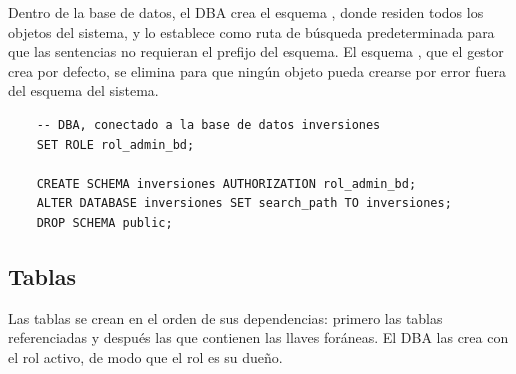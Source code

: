 Dentro de la base de datos, el DBA crea el esquema , donde residen todos los objetos del sistema, y lo establece como ruta de búsqueda predeterminada para que las sentencias no requieran el prefijo del esquema. El esquema , que el gestor crea por defecto, se elimina para que ningún objeto pueda crearse por error fuera del esquema del sistema.

\begin{verbatim}
	-- DBA, conectado a la base de datos inversiones
	SET ROLE rol_admin_bd;
	
	CREATE SCHEMA inversiones AUTHORIZATION rol_admin_bd;
	ALTER DATABASE inversiones SET search_path TO inversiones;
	DROP SCHEMA public;
\end{verbatim}

\subsection{Tablas}
Las tablas se crean en el orden de sus dependencias: primero las tablas referenciadas y después las que contienen las llaves foráneas. El DBA las crea con el rol  activo, de modo que el rol es su dueño.

